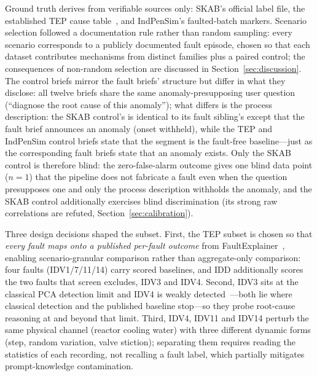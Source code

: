 \documentclass[preprint,10pt]{elsarticle}
\begin{document}
Ground truth derives from verifiable sources only: SKAB's official label file, the established TEP cause table~\cite{chiang2001fault}, and IndPenSim's faulted-batch markers. Scenario selection followed a documentation rule rather than random sampling: every scenario corresponds to a publicly documented fault episode, chosen so that each dataset contributes mechanisms from distinct families plus a paired control; the consequences of non-random selection are discussed in Section~\ref{sec:discussion}. 
The control briefs mirror the fault briefs' structure but differ in what they disclose: all twelve briefs share the same anomaly-presupposing user question (``diagnose the root cause of this anomaly''); what differs is the process description: the SKAB control's is identical to its fault sibling's except that the fault brief announces an anomaly (onset withheld), while the TEP and IndPenSim control briefs state that the segment is the fault-free baseline---just as the corresponding fault briefs state that an anomaly exists. Only the SKAB control is therefore blind: the zero-false-alarm outcome gives one blind data point ($n{=}1$) that the pipeline does not fabricate a fault even when the question presupposes one and only the process description withholds the anomaly, and the SKAB control additionally exercises blind discrimination (its strong raw correlations are refuted, Section~\ref{sec:calibration}).

Three design decisions shaped the subset. First, the TEP subset is chosen so that \emph{every fault maps onto a published per-fault outcome} from FaultExplainer~\cite{khan2024faultexplainer}, enabling scenario-granular comparison rather than aggregate-only comparison: four faults (IDV1/7/11/14) carry scored baselines, and IDD additionally scores the two faults that screen excludes, IDV3 and IDV4. Second, IDV3 sits at the classical PCA detection limit and IDV4 is weakly detected~\cite{russell2000delay,chiang2001fault}---both lie where classical detection and the published baseline stop---so they probe root-cause reasoning at and beyond that limit. Third, IDV4, IDV11 and IDV14 perturb the same physical channel (reactor cooling water) with three different dynamic forms (step, random variation, valve stiction); separating them requires reading the statistics of each recording, not recalling a fault label, which partially mitigates prompt-knowledge contamination.
\end{document}

